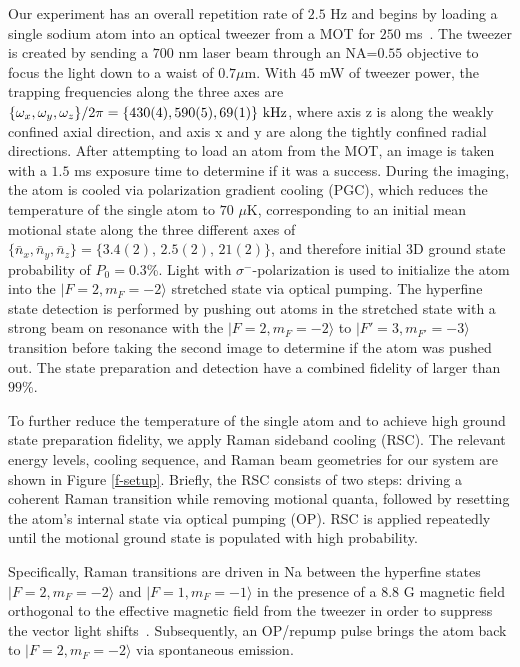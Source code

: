 \documentclass[aps,prl,twocolumn,groupedaddress]{revtex4-1}
\begin{document}
Our experiment has an overall repetition rate of $2.5$ Hz and
begins by loading a single sodium atom into an optical tweezer from a MOT
for $250$ ms~\cite{Hutzler2017-LightShifts}.
The tweezer is created by sending a $700$ nm laser beam through an NA=$0.55$ objective to
focus the light down to a waist of $0.7 \mu$m.
With $45$ mW of tweezer power, the trapping frequencies along the three axes are
$\{\omega_x,\omega_y,\omega_z\}/2\pi = \{430(4), 590(5), 69(1)\}\ \text{\text{kHz}}$,
where axis z is along the weakly confined axial direction,
and axis x and y are along the tightly confined radial directions.
After attempting to load an atom from the MOT, an image is taken with a $1.5$ ms exposure time
to determine if it was a success.
During the imaging, the atom is cooled via polarization gradient cooling (PGC),
which reduces the temperature of the single atom to $70$ $\mu$K,
corresponding to an initial mean motional state along the three different axes of
$\{\bar n_x, \bar n_y, \bar n_z\}=\{3.4(2),\, 2.5(2),\, 21(2)\}$, and therefore initial 3D ground state probability of $P_0=0.3$\%.
Light with $\sigma^-$-polarization is used to initialize the atom into
the $|F=2, m_F=-2\rangle$ stretched state via optical pumping.
The hyperfine state detection is performed by pushing out atoms in the stretched state with a strong
beam on resonance with the $|F=2, m_F=-2\rangle$ to $|F'=3, m_{F'}=-3\rangle$ transition before
taking the second image to determine if the atom was pushed out.
The state preparation and detection have a combined fidelity of larger than $99$\%.

To further reduce the temperature of the single atom and
to achieve high ground state preparation fidelity, we apply Raman sideband cooling (RSC).
The relevant energy levels, cooling sequence, and Raman beam geometries for our system
are shown in Figure \ref{f-setup}. Briefly, the RSC consists of two steps:
driving a coherent Raman transition while removing motional quanta, followed by resetting the atom's internal state via optical pumping (OP).
RSC is applied repeatedly until the motional ground state is populated with high probability.

Specifically, Raman transitions are driven in Na between the hyperfine states
$|F=2, m_F=-2\rangle$ and $|F=1, m_F=-1\rangle$ in the presence of a $8.8$ G magnetic field
orthogonal to the effective magnetic field from the tweezer
in order to suppress the vector light shifts~\cite{Kaufman2012,Thompson2013}.
Subsequently, an OP/repump pulse brings the atom back to $|F=2, m_F=-2\rangle$
via spontaneous emission.
\end{document}

